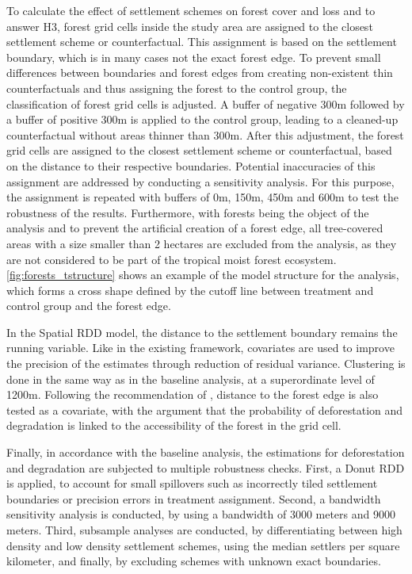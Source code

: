 To calculate the effect of settlement schemes on forest cover and loss and to answer H3, forest grid cells inside the study area are assigned to the closest settlement scheme or counterfactual.
This assignment is based on the settlement boundary, which is in many cases not the exact forest edge.
To prevent small differences between boundaries and forest edges from creating non-existent thin counterfactuals and thus assigning the forest to the control group, the classification of forest grid cells is adjusted.
A buffer of negative 300m followed by a buffer of positive 300m is applied to the control group, leading to a cleaned-up counterfactual without areas thinner than 300m.
After this adjustment, the forest grid cells are assigned to the closest settlement scheme or counterfactual, based on the distance to their respective boundaries.
Potential inaccuracies of this assignment are addressed by conducting a sensitivity analysis.
For this purpose, the assignment is repeated with buffers of 0m, 150m, 450m and 600m to test the robustness of the results.
Furthermore, with forests being the object of the analysis and to prevent the artificial creation of a forest edge,
all tree-covered areas with a size smaller than 2 hectares are excluded from the analysis, as they are not considered to be part of the tropical moist forest ecosystem.
\cref{fig:forests_tstructure} shows an example of the model structure for the analysis, which forms a cross shape defined by the cutoff line between treatment and control group and the forest edge.

In the Spatial RDD model, the distance to the settlement boundary remains the running variable.
Like in the existing framework, covariates are used to improve the precision of the estimates through reduction of residual variance.
Clustering is done in the same way as in the baseline analysis, at a superordinate level of 1200m.
Following the recommendation of \cite{brandtSustainableIntensificationDairy2018}, distance to the forest edge is also tested as a covariate,
with the argument that the probability of deforestation and degradation is linked to the accessibility of the forest in the grid cell.

Finally, in accordance with the baseline analysis, the estimations for deforestation and degradation are subjected to multiple robustness checks.
First, a Donut RDD is applied, to account for small spillovers such as incorrectly tiled settlement boundaries or precision errors in treatment assignment.
Second, a bandwidth sensitivity analysis is conducted, by using a bandwidth of 3000 meters and 9000 meters.
Third, subsample analyses are conducted, by differentiating between high density and low density settlement schemes,
using the median settlers per square kilometer, and finally, by excluding schemes with unknown exact boundaries.